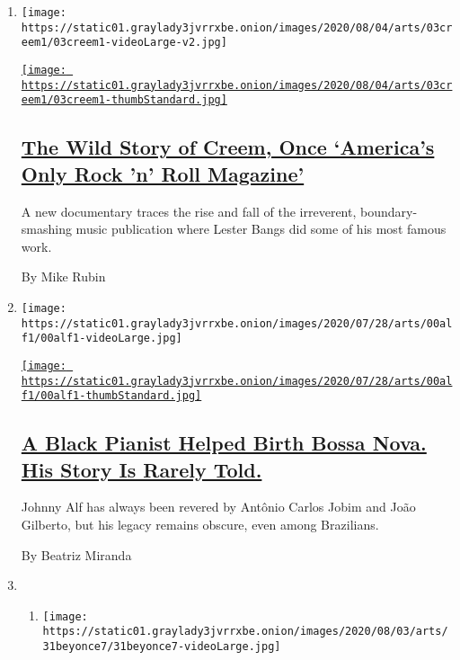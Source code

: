 \begin{enumerate}
\def\labelenumi{\arabic{enumi}.}
\item
  \texttt{[image: https://static01.graylady3jvrrxbe.onion/images/2020/08/04/arts/03creem1/03creem1-videoLarge-v2.jpg]}

  \href{/2020/08/03/arts/music/creem-magazine-documentary.html}{\texttt{[image: https://static01.graylady3jvrrxbe.onion/images/2020/08/04/arts/03creem1/03creem1-thumbStandard.jpg]}}

  \hypertarget{the-wild-story-of-creem-once-americas-only-rock-n-roll-magazine}{%
  \subsection{\texorpdfstring{\href{/2020/08/03/arts/music/creem-magazine-documentary.html}{The
  Wild Story of Creem, Once `America's Only Rock 'n' Roll
  Magazine'}}{The Wild Story of Creem, Once `America's Only Rock 'n' Roll Magazine'}}\label{the-wild-story-of-creem-once-americas-only-rock-n-roll-magazine}}

  A new documentary traces the rise and fall of the irreverent,
  boundary-smashing music publication where Lester Bangs did some of his
  most famous work.

  By Mike Rubin
\item
  \texttt{[image: https://static01.graylady3jvrrxbe.onion/images/2020/07/28/arts/00alf1/00alf1-videoLarge.jpg]}

  \href{/2020/08/04/arts/music/johnny-alf-bossa-nova.html}{\texttt{[image: https://static01.graylady3jvrrxbe.onion/images/2020/07/28/arts/00alf1/00alf1-thumbStandard.jpg]}}

  \hypertarget{a-black-pianist-helped-birth-bossa-nova-his-story-is-rarely-told}{%
  \subsection{\texorpdfstring{\href{/2020/08/04/arts/music/johnny-alf-bossa-nova.html}{A
  Black Pianist Helped Birth Bossa Nova. His Story Is Rarely
  Told.}}{A Black Pianist Helped Birth Bossa Nova. His Story Is Rarely Told.}}\label{a-black-pianist-helped-birth-bossa-nova-his-story-is-rarely-told}}

  Johnny Alf has always been revered by Antônio Carlos Jobim and João
  Gilberto, but his legacy remains obscure, even among Brazilians.

  By Beatriz Miranda
\item
  \begin{enumerate}
  \def\labelenumii{\arabic{enumii}.}
  \item
    \texttt{[image: https://static01.graylady3jvrrxbe.onion/images/2020/08/03/arts/31beyonce7/31beyonce7-videoLarge.jpg]}


\end{enumerate}
\end{enumerate}
